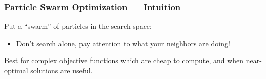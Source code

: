 \documentclass[xcolor=dvipsnames]{beamer}
\begin{document}
\begin{frame}
  \frametitle{Particle Swarm Optimization --- Intuition}
Put a ``swarm'' of particles in the search space:\\
\begin{itemize}
\item[] Don't search alone, pay attention to what your neighbors are doing!\pause
\end{itemize}
\begin{center}
\end{center}
Best for {\color{red} complex} objective functions which are {\color{red} cheap} to compute, and when {\color{red} near-optimal} solutions are useful.
\end{frame}
\end{document}
